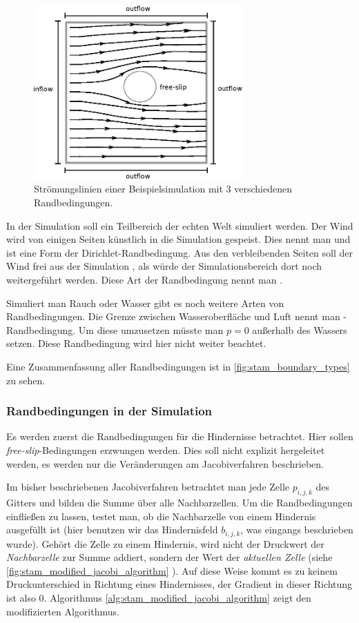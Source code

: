\begin{figure}[ht]
\centering
\includegraphics[width=8cm]{images/boundary_types}
\caption{Strömungslinien einer Beispielsimulation mit 3 verschiedenen Randbedingungen.}
\label{fig:stam_boundary_types}
\end{figure}

In der Simulation soll ein Teilbereich der echten Welt simuliert werden. Der
Wind wird von einigen Seiten künstlich in die Simulation gespeist. Dies nennt
man  und ist eine Form der
Dirichlet-Randbedingung. Aus den verbleibenden Seiten soll der Wind frei aus der
Simulation , als würde der Simulationsbereich dort
noch weitergeführt werden. Diese Art der Randbedingung nennt man
.

Simuliert man Rauch oder Wasser gibt es noch weitere Arten von Randbedingungen.
Die Grenze zwischen Wasseroberfläche und Luft nennt man -Randbedingung. Um diese umzusetzen müsste man $p=0$ außerhalb
des Wassers setzen. Diese Randbedingung wird hier nicht weiter beachtet.

Eine Zusammenfassung aller Randbedingungen ist in \autoref{fig:stam_boundary_types} zu sehen.

\subsubsection{Randbedingungen in der Simulation}

Es werden zuerst die Randbedingungen für die Hindernisse betrachtet. Hier sollen
\emph{free-slip}-Bedingungen erzwungen werden. Dies soll nicht explizit
hergeleitet werden, es werden nur die Veränderungen am Jacobiverfahren
beschrieben.

Im bisher beschriebenen Jacobiverfahren betrachtet man jede Zelle $p_{i,j,k}$
des Gitters und bilden die Summe über alle Nachbarzellen. Um die Randbedingungen
einfließen zu lassen, testet man, ob die Nachbarzelle von einem Hindernis
ausgefüllt ist (hier benutzen wir das Hindernisfeld $b_{i,j,k}$, was eingangs
beschrieben wurde). Gehört die Zelle zu einem Hindernis, wird nicht der
Druckwert der \emph{Nachbarzelle} zur Summe addiert, sondern der Wert der
\emph{aktuellen Zelle} (siehe \autoref{fig:stam_modified_jacobi_algorithm}
). Auf
diese Weise kommt es zu keinem Druckunterschied in Richtung eines Hindernisses,
der Gradient in dieser Richtung ist also 0.  Algorithmus
\autoref{alg:stam_modified_jacobi_algorithm} zeigt den modifizierten
Algorithmus.

